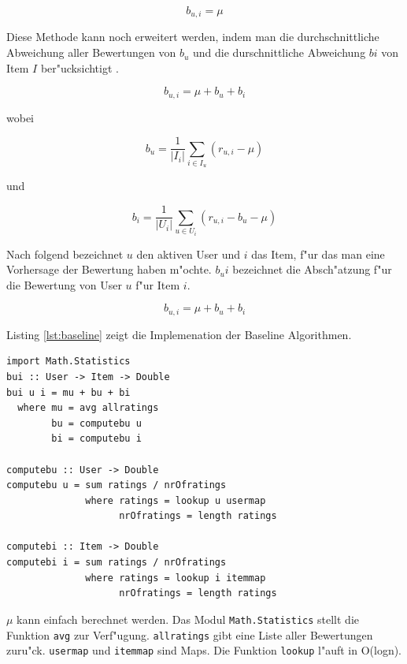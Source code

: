 \documentclass[a4paper, 12pt]{article}
\begin{document}
\begin{equation}
  \label{eq:avg}
  b_{u,i} = \mu
\end{equation}

Diese Methode kann noch erweitert werden, indem man die durchschnittliche Abweichung aller Bewertungen von $b_u$ und die durschnittliche Abweichung $bi$ von Item $I$ ber"ucksichtigt \cite{jannach11}.

\begin{equation}
  \label{eq:bui}
  b_{u,i} = \mu + b_u + b_i
\end{equation}

wobei

\begin{equation}
  b_u = \frac{1}{|I_i|}\sum_{i \in I_u}(r_{u,i} - \mu)
\end{equation}

und 

\begin{equation}
  \label{eq:bi}
  b_i = \frac{1}{|U_i|}\sum_{u \in U_i}(r_{u,i} - b_u - \mu)
\end{equation}

Nach folgend bezeichnet $u$ den aktiven User und $i$ das Item, f"ur das man eine Vorhersage der Bewertung haben m"ochte. $b_ui$ bezeichnet die Absch"atzung f"ur die Bewertung von User $u$ f"ur Item $i$.

\begin{equation}
  \label{eq:baseline}
  b_{u,i} = \mu + b_u + b_i
\end{equation}

Listing \ref{lst:baseline} zeigt die Implemenation der Baseline Algorithmen.

\begin{lstlisting}[caption=Baseline predictor, label=lst:baseline]
import Math.Statistics
bui :: User -> Item -> Double
bui u i = mu + bu + bi
  where mu = avg allratings
        bu = computebu u
        bi = computebu i

computebu :: User -> Double
computebu u = sum ratings / nrOfratings
              where ratings = lookup u usermap
                    nrOfratings = length ratings

computebi :: Item -> Double
computebi i = sum ratings / nrOfratings
              where ratings = lookup i itemmap
                    nrOfratings = length ratings
\end{lstlisting}

$\mu$ kann einfach berechnet werden. Das Modul \verb|Math.Statistics| stellt die Funktion \verb|avg| zur Verf"ugung. \verb|allratings| gibt eine Liste aller Bewertungen zuru"ck. \verb|usermap| und \verb|itemmap| sind Maps. Die Funktion \verb|lookup| l"auft in O(logn).
\end{document}

